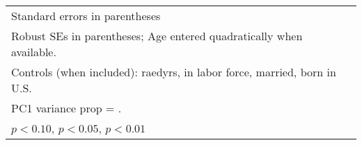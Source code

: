 \begin{table}[htbp]
{\begin{tabular}{l*{8}{c}}
\bottomrule
\multicolumn{9}{l}{\footnotesize Standard errors in parentheses}\\
\multicolumn{9}{l}{\footnotesize Robust SEs in parentheses; Age entered quadratically when available.}\\
\multicolumn{9}{l}{\footnotesize Controls (when included): raedyrs, in labor force, married, born in U.S.}\\
\multicolumn{9}{l}{\footnotesize PC1 variance prop =      .}\\
\multicolumn{9}{l}{\footnotesize \sym{*} \(p<0.10\), \sym{**} \(p<0.05\), \sym{***} \(p<0.01\)}\\
\end{tabular}
}%
\end{table}
